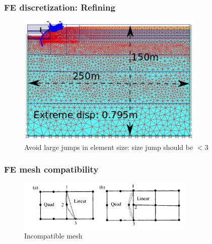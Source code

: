 \documentclass[notes]{beamer}
\begin{document}
\begin{frame}
\frametitle{FE discretization: Refining}
\begin{figure}[ht]
	\centering
	\includegraphics[width=0.8\textwidth]{figs/refined-mesh.png}
	\caption*{Avoid large jumps in element size: size jump should be $< 3$}
\end{figure}
\end{frame}


\begin{frame}
\frametitle{FE mesh compatibility}

\begin{figure}[ht]
	\centering
	\includegraphics[width=0.75\textwidth]{figs/mesh-incompatibility.png}
	\caption*{Incompatible mesh}
\end{figure}

\end{frame}
\end{document}

